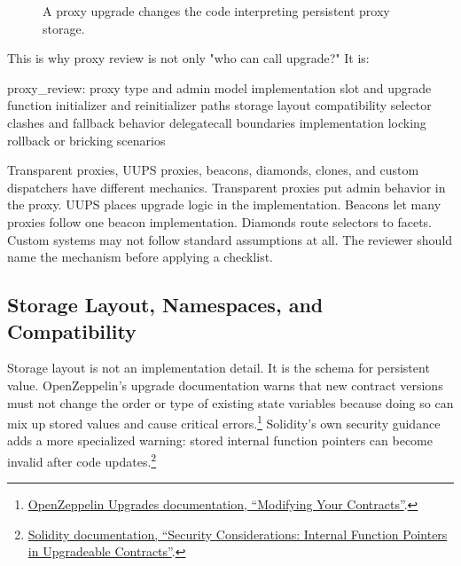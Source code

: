 \begin{figure}[htbp]
\centering
{}
\caption{A proxy upgrade changes the code interpreting persistent proxy storage.}
\end{figure}

This is why proxy review is not only "who can call upgrade?" It is:

\begin{codeblock}
proxy_review:
    proxy type and admin model
    implementation slot and upgrade function
    initializer and reinitializer paths
    storage layout compatibility
    selector clashes and fallback behavior
    delegatecall boundaries
    implementation locking
    rollback or bricking scenarios
\end{codeblock}

Transparent proxies, UUPS proxies, beacons, diamonds, clones, and custom dispatchers have different mechanics. Transparent proxies put admin behavior in the proxy. UUPS places upgrade logic in the implementation. Beacons let many proxies follow one beacon implementation. Diamonds route selectors to facets. Custom systems may not follow standard assumptions at all. The reviewer should name the mechanism before applying a checklist.

\subsection{Storage Layout, Namespaces, and Compatibility}

Storage layout is not an implementation detail. It is the schema for persistent value. OpenZeppelin's upgrade documentation warns that new contract versions must not change the order or type of existing state variables because doing so can mix up stored values and cause critical errors.\footnote{\href{https://docs.openzeppelin.com/upgrades-plugins/writing-upgradeable\#modifying-your-contracts}{OpenZeppelin Upgrades documentation, ``Modifying Your Contracts''}.} Solidity's own security guidance adds a more specialized warning: stored internal function pointers can become invalid after code updates.\footnote{\href{https://docs.soliditylang.org/en/latest/security-considerations.html\#internal-function-pointers-in-upgradeable-contracts}{Solidity documentation, ``Security Considerations: Internal Function Pointers in Upgradeable Contracts''}.}

